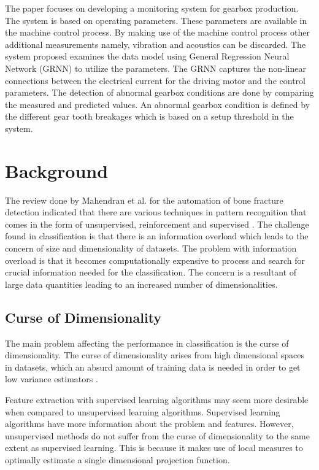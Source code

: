 \documentclass[11pt]{article}
\begin{document}
	The paper \cite{Baqqar2012} focuses on developing a monitoring system for gearbox production. The system is based on operating parameters. These parameters are available in the machine control process. By making use of the machine control process other additional measurements namely, vibration and acoustics can be discarded. The system proposed examines the data model using General Regression Neural Network (GRNN) to utilize the parameters. The GRNN captures the non-linear connections between the electrical current for the driving motor and the control parameters. The detection of abnormal gearbox conditions are done by comparing the measured and predicted values. An abnormal gearbox condition is defined by the different gear tooth breakages which is based on a setup threshold in the system. 
	
	\section{Background}
	\label{sc: Background}
	The review done by Mahendran et al. for the automation of bone fracture detection indicated that there are various techniques in pattern recognition that comes in the form of unsupervised, reinforcement and supervised \cite{Mahendran2011}. The challenge found in classification is that there is an information overload which leads to the concern of size and dimensionality of datasets. The problem with information overload is that it becomes computationally expensive to process and search for crucial information needed for the classification. The concern is a resultant of large data quantities leading to an increased number of dimensionalities. 
	
	\subsection{Curse of Dimensionality}
	The main problem affecting the performance in classification is the curse of dimensionality. The curse of dimensionality arises from high dimensional spaces in datasets, which an absurd amount of training data is needed in order to get low variance estimators \cite{intrator_feature_1992}.
	
	Feature extraction with supervised learning algorithms may seem more desirable when compared to unsupervised learning algorithms. Supervised learning algorithms have more information about the problem and features. However, unsupervised methods do not suffer from the curse of dimensionality to the same extent as supervised learning. This is because it makes use of local measures to optimally estimate a single dimensional projection function\cite{intrator_feature_1992}.
	
\end{document}
